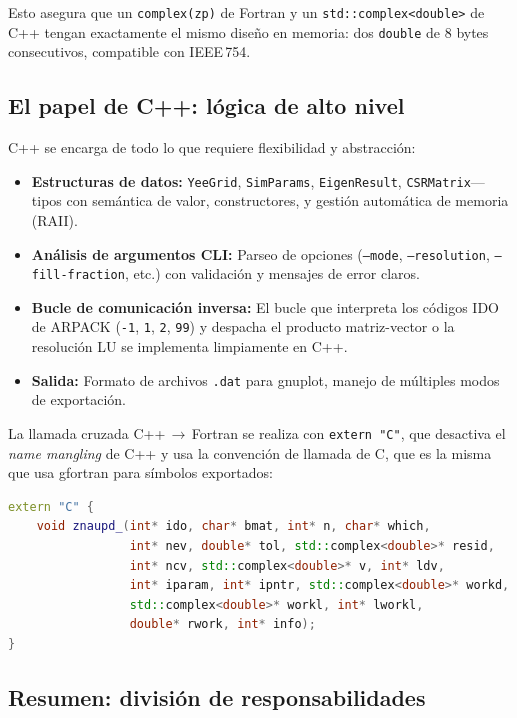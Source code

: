 \documentclass[12pt,a4paper]{article}
\begin{document}
Esto asegura que un \texttt{complex(zp)} de Fortran y un \texttt{std::complex<double>} de C++ tengan exactamente el mismo diseño en memoria: dos \texttt{double} de 8 bytes consecutivos, compatible con IEEE\,754.

\subsection{El papel de C++: lógica de alto nivel}

C++ se encarga de todo lo que requiere flexibilidad y abstracción:

\begin{itemize}
    \item \textbf{Estructuras de datos:} \texttt{YeeGrid}, \texttt{SimParams}, \texttt{EigenResult}, \texttt{CSRMatrix}—tipos con semántica de valor, constructores, y gestión automática de memoria (RAII).
    \item \textbf{Análisis de argumentos CLI:} Parseo de opciones (\texttt{--mode}, \texttt{--resolution}, \texttt{--fill-fraction}, etc.) con validación y mensajes de error claros.
    \item \textbf{Bucle de comunicación inversa:} El bucle que interpreta los códigos IDO de ARPACK (\texttt{-1}, \texttt{1}, \texttt{2}, \texttt{99}) y despacha el producto matriz-vector o la resolución LU se implementa limpiamente en C++.
    \item \textbf{Salida:} Formato de archivos \texttt{.dat} para gnuplot, manejo de múltiples modos de exportación.
\end{itemize}

La llamada cruzada C++\,$\to$\,Fortran se realiza con \texttt{extern "C"}, que desactiva el \textit{name mangling} de C++ y usa la convención de llamada de C, que es la misma que usa gfortran para símbolos exportados:

\begin{lstlisting}[language=C++, caption={Declaracion extern "C" en eigensolver.cpp}]
extern "C" {
    void znaupd_(int* ido, char* bmat, int* n, char* which,
                 int* nev, double* tol, std::complex<double>* resid,
                 int* ncv, std::complex<double>* v, int* ldv,
                 int* iparam, int* ipntr, std::complex<double>* workd,
                 std::complex<double>* workl, int* lworkl,
                 double* rwork, int* info);
}
\end{lstlisting}

\subsection{Resumen: división de responsabilidades}
\end{document}
